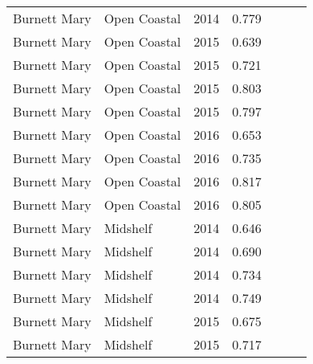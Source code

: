 {\begin{longtable}{llccccc}
  Burnett Mary & Open Coastal & 2014 & 0.779 & \cellcolor[HTML]{B0D235}{B} & \cellcolor[HTML]{B0D235}{B} & \cellcolor[HTML]{B0D235}{B} \\ 
  Burnett Mary & Open Coastal & 2015 & 0.639 & \cellcolor[HTML]{F0C918}{C} & \cellcolor[HTML]{B0D235}{B} & \cellcolor[HTML]{F0C918}{C} \\ 
  Burnett Mary & Open Coastal & 2015 & 0.721 & \cellcolor[HTML]{B0D235}{B} & \cellcolor[HTML]{B0D235}{B} & \cellcolor[HTML]{B0D235}{B} \\ 
  Burnett Mary & Open Coastal & 2015 & 0.803 & \cellcolor[HTML]{B0D235}{B} & \cellcolor[HTML]{00734D}{A} & \cellcolor[HTML]{B0D235}{B} \\ 
  Burnett Mary & Open Coastal & 2015 & 0.797 & \cellcolor[HTML]{B0D235}{B} & \cellcolor[HTML]{B0D235}{B} & \cellcolor[HTML]{B0D235}{B} \\ 
  Burnett Mary & Open Coastal & 2016 & 0.653 & \cellcolor[HTML]{F0C918}{C} & \cellcolor[HTML]{B0D235}{B} & \cellcolor[HTML]{B0D235}{B} \\ 
  Burnett Mary & Open Coastal & 2016 & 0.735 & \cellcolor[HTML]{B0D235}{B} & \cellcolor[HTML]{B0D235}{B} & \cellcolor[HTML]{B0D235}{B} \\ 
  Burnett Mary & Open Coastal & 2016 & 0.817 & \cellcolor[HTML]{B0D235}{B} & \cellcolor[HTML]{00734D}{A} & \cellcolor[HTML]{B0D235}{B} \\ 
  Burnett Mary & Open Coastal & 2016 & 0.805 & \cellcolor[HTML]{B0D235}{B} & \cellcolor[HTML]{00734D}{A} & \cellcolor[HTML]{B0D235}{B} \\ 
  Burnett Mary & Midshelf & 2014 & 0.646 & \cellcolor[HTML]{F0C918}{C} & \cellcolor[HTML]{B0D235}{B} & \cellcolor[HTML]{F0C918}{C} \\ 
  Burnett Mary & Midshelf & 2014 & 0.690 & \cellcolor[HTML]{B0D235}{B} & \cellcolor[HTML]{B0D235}{B} & \cellcolor[HTML]{B0D235}{B} \\ 
  Burnett Mary & Midshelf & 2014 & 0.734 & \cellcolor[HTML]{B0D235}{B} & \cellcolor[HTML]{B0D235}{B} & \cellcolor[HTML]{B0D235}{B} \\ 
  Burnett Mary & Midshelf & 2014 & 0.749 & \cellcolor[HTML]{B0D235}{B} & \cellcolor[HTML]{B0D235}{B} & \cellcolor[HTML]{B0D235}{B} \\ 
  Burnett Mary & Midshelf & 2015 & 0.675 & \cellcolor[HTML]{B0D235}{B} & \cellcolor[HTML]{B0D235}{B} & \cellcolor[HTML]{B0D235}{B} \\ 
  Burnett Mary & Midshelf & 2015 & 0.717 & \cellcolor[HTML]{B0D235}{B} & \cellcolor[HTML]{B0D235}{B} & \cellcolor[HTML]{B0D235}{B} \\ 

\end{longtable}}
